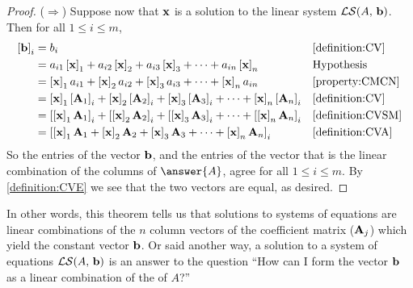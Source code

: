 \documentclass{ximera}
\begin{document}
\begin{theorem}
\begin{proof}
    ($\Rightarrow$) Suppose now that $\mathbf{x}$ is a solution to the
    linear system $\mathcal{LS}\!\left(A,\,\mathbf{b}\right)$.  Then for all
    $1\leq i\leq m$,
    \begin{align*}
      \left\lbrack\mathbf{b}\right\rbrack_{i}
      &=b_i&&\ref{definition:CV}\\
      &=
        a_{i1}\left\lbrack\mathbf{x}\right\rbrack_{1}+
        a_{i2}\left\lbrack\mathbf{x}\right\rbrack_{2}+
        a_{i3}\left\lbrack\mathbf{x}\right\rbrack_{3}+
        \cdots+
        a_{in}\left\lbrack\mathbf{x}\right\rbrack_{n}
           &&\text{Hypothesis}\\
      &=
        \left\lbrack\mathbf{x}\right\rbrack_{1}a_{i1}+
        \left\lbrack\mathbf{x}\right\rbrack_{2}a_{i2}+
        \left\lbrack\mathbf{x}\right\rbrack_{3}a_{i3}+
        \cdots+
        \left\lbrack\mathbf{x}\right\rbrack_{n}a_{in}
           &&\ref{property:CMCN}\\
      &=
        \left\lbrack\mathbf{x}\right\rbrack_{1}\left\lbrack\mathbf{A}_1\right\rbrack_{i}+
        \left\lbrack\mathbf{x}\right\rbrack_{2}\left\lbrack\mathbf{A}_2\right\rbrack_{i}+
        \left\lbrack\mathbf{x}\right\rbrack_{3}\left\lbrack\mathbf{A}_3\right\rbrack_{i}+
        \cdots+
        \left\lbrack\mathbf{x}\right\rbrack_{n}\left\lbrack\mathbf{A}_n\right\rbrack_{i}
           &&\ref{definition:CV}\\
      &=
        \left\lbrack\left\lbrack\mathbf{x}\right\rbrack_{1}\mathbf{A}_1\right\rbrack_{i}+
        \left\lbrack\left\lbrack\mathbf{x}\right\rbrack_{2}\mathbf{A}_2\right\rbrack_{i}+
        \left\lbrack\left\lbrack\mathbf{x}\right\rbrack_{3}\mathbf{A}_3\right\rbrack_{i}+
        \cdots+
        \left\lbrack\left\lbrack\mathbf{x}\right\rbrack_{n}\mathbf{A}_n\right\rbrack_{i}
           &&\ref{definition:CVSM}\\
      &=\left\lbrack
        \left\lbrack\mathbf{x}\right\rbrack_{1}\mathbf{A}_1+
        \left\lbrack\mathbf{x}\right\rbrack_{2}\mathbf{A}_2+
        \left\lbrack\mathbf{x}\right\rbrack_{3}\mathbf{A}_3+
        \cdots+
        \left\lbrack\mathbf{x}\right\rbrack_{n}\mathbf{A}_n
        \right\rbrack_{i}&&\ref{definition:CVA}
    \end{align*}
    So the entries of the vector $\mathbf{b}$, and the entries of the
    vector that is the linear combination of the columns of
    $\answer{A}$, agree for all $1\leq i\leq m$.  By
    \ref{definition:CVE} we see that the two vectors are equal, as
    desired.
\end{proof}
\end{theorem}

\begin{example}
  In other words, this theorem tells us that solutions to systems of
  equations are linear combinations of the $n$ column vectors of the
  coefficient matrix ($\mathbf{A}_j$) which yield the constant vector
  $\mathbf{b}$.  Or said another way, a solution to a system of
  equations $\mathcal{LS}\!\left(A,\,\mathbf{b}\right)$ is an answer to the question
  ``How can I form the vector $\mathbf{b}$ as a linear combination of
  the  of $A$?''
\end{example}
\end{document}
